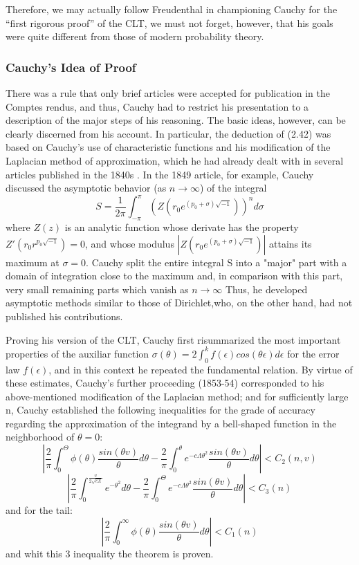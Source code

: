 \documentclass{article}
\begin{document}
Therefore, we may actually follow Freudenthal \cite{Fischer2010History} in championing Cauchy for the “first rigorous proof” of the CLT, we must not forget, however,
that his goals were quite different from those of modern probability theory.

\subsubsection{Cauchy’s Idea of Proof}

There was a rule that only brief articles were accepted for publication in the Comptes rendus, and thus, Cauchy had to restrict his presentation to a description of the major steps of his reasoning. The basic ideas, however, can be clearly discerned from his account. In particular, the deduction of (2.42) was based on Cauchy’s use of characteristic functions and his modification of the Laplacian method of approximation, which he had already dealt with in several articles published in the 1840s  \cite{Fischer2010History}.
In the 1849 article, for example, Cauchy discussed the asymptotic behavior (as $n \rightarrow \infty$) of the integral
\[S=\frac{1}{2\pi} \int_{-\pi}^\pi (Z(r_0e^{(p_0 + \sigma)\sqrt{-1}}))^n d\sigma \]
where $Z(z)$ is an analytic function whose derivate has the property $Z' (r_0r^{p_0 \sqrt{-1} }) =0 $, and whose modulus $|Z(r_0e^{(p_0 + \sigma)\sqrt{-1}})|$ attains its maximum at $\sigma= 0$. Cauchy split the entire integral S into a "major" part with a domain of integration close to the maximum and, in comparison with this part, very small remaining parts which vanish as $n  \rightarrow \infty$ Thus, he developed asymptotic methods similar to those of Dirichlet,who, on the other hand, had not published his contributions.

Proving his version of the CLT, Cauchy \cite{1852Comptes} first
risummarized the most important properties of the auxiliar function 
$	\sigma(\theta) = 2 \int_0^k f(\epsilon)cos(\theta\epsilon)d\epsilon$ for the error law $f(\epsilon)$, and in this context he repeated the fundamental relation.
By virtue of these estimates, Cauchy’s further proceeding (1853-54)
corresponded to his above-mentioned modification of the Laplacian method; and for sufficiently large n, Cauchy established the following inequalities for the grade of accuracy regarding the approximation of the integrand by a bell-shaped function in the neighborhood of $\theta=0$:
\[  |\frac{2}{\pi }\int_0^\Theta \phi (\theta)\frac{sin(\theta v)}{\theta}d\theta- \frac{2}{\pi}\int_0^\theta e^{-c\Lambda \theta^2 } \frac{sin(\theta v)}{\theta} d\theta| <C_2(n,v) \]
\[ |\frac{2}{\pi} \int_0^{\frac{v}{2\sqrt{c\Lambda}}} e^{-\theta^2} d\theta -\frac{2}{\pi} \int_0^\Theta e^{-c\Lambda \theta^2 } \frac{sin(\theta v)}{\theta} d\theta |<C_3(n)\]
and for the tail:
\[|\frac{2}{\pi }\int_0^\infty \phi (\theta)\frac{sin(\theta v)}{\theta}d\theta | < C_1(n)\]
and whit this 3 inequality the theorem is proven.
\end{document}
